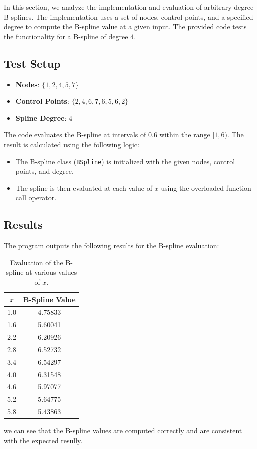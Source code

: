 \documentclass[a4paper]{article}
\begin{document}
In this section, we analyze the implementation and evaluation of arbitrary degree B-splines. The implementation uses a set of nodes, control points, and a specified degree to compute the B-spline value at a given input. The provided code tests the functionality for a B-spline of degree 4.

\subsection*{Test Setup}

\begin{itemize}
    \item \textbf{Nodes}: $\{1, 2, 4, 5, 7\}$
    \item \textbf{Control Points}: $\{2, 4, 6, 7, 6, 5, 6, 2\}$
    \item \textbf{Spline Degree}: $4$
\end{itemize}

The code evaluates the B-spline at intervals of $0.6$ within the range $[1, 6)$. The result is calculated using the following logic:

\begin{itemize}
    \item The B-spline class (\texttt{BSpline}) is initialized with the given nodes, control points, and degree.
    \item The spline is then evaluated at each value of $x$ using the overloaded function call operator.
\end{itemize}

\subsection*{Results}

The program outputs the following results for the B-spline evaluation:

\begin{table}[ht]
\centering
\begin{tabular}{|c|c|}
\hline
$x$ & B-Spline Value \\
\hline
1.0 & 4.75833 \\
1.6 & 5.60041 \\
2.2 & 6.20926 \\
2.8 & 6.52732 \\
3.4 & 6.54297 \\
4.0 & 6.31548 \\
4.6 & 5.97077 \\
5.2 & 5.64775 \\
5.8 & 5.43863 \\
\hline
\end{tabular}
\caption*{Evaluation of the B-spline at various values of $x$.}
\end{table}

we can see that the B-spline values are computed correctly and are consistent with the expected resully. 
\end{document}
